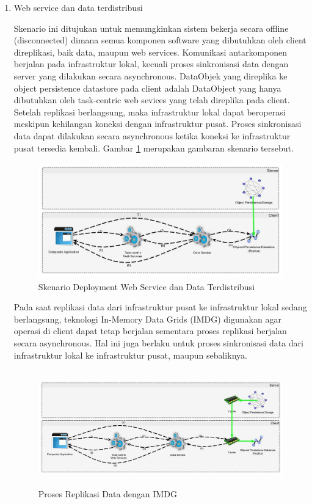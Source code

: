 \begin{enumerate}
\item Web service dan data terdistribusi

Skenario ini ditujukan untuk memungkinkan sistem bekerja secara offline (disconnected) dimana semua komponen software yang dibutuhkan oleh client direplikasi, baik data, maupun web services. Komunikasi antarkomponen berjalan pada infrastruktur lokal, kecuali proses sinkronisasi data dengan server yang dilakukan secara asynchronous. DataObjek yang direplika ke object persistence datastore pada client adalah DataObject yang hanya dibutuhkan oleh task-centric web sevices yang telah direplika pada client. Setelah replikasi berlangsung, maka infrastruktur lokal dapat beroperasi meskipun kehilangan koneksi dengan infrastruktur pusat. Proses sinkronisasi data dapat dilakukan secara asynchronous ketika koneksi ke infrastruktur pusat tersedia kembali. Gambar \ref{fig:deployment-3a} merupakan gambaran skenario tersebut.

\begin{figure}[H]
    \centering
    \includegraphics[height=5cm]{images/deployment-3a}
    \caption{Skenario Deployment Web Service dan Data Terdistribusi}
    \label{fig:deployment-3a}
\end{figure}

Pada saat replikasi data dari infrastruktur pusat ke infrastruktur lokal sedang berlangsung, teknologi In-Memory Data Grids (IMDG) digunakan agar operasi di client dapat tetap berjalan sementara proses replikasi berjalan secara asynchronous. Hal ini juga berlaku untuk proses sinkronisasi data dari infrastruktur lokal ke infrastruktur pusat, maupun sebaliknya.

\begin{figure}[H]
    \centering
    \includegraphics[height=5cm]{images/deployment-3b}
    \caption{Proses Replikasi Data dengan IMDG}
    \label{fig:deployment-3b}
\end{figure}
\end{enumerate}


